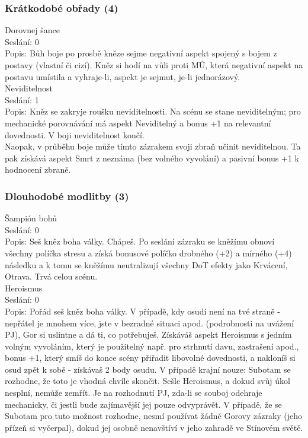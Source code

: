 \documentclass[../main.tex]{subfiles}
\begin{document}
\subsubsection{Krátkodobé obřady (4)}


Dorovnej šance\\
Seslání: 0 \\
Popis: Bůh boje po prosbě kněze sejme negativní aspekt spojený s bojem z postavy (vlastní či cizí).  Kněz si hodí na vůli proti MÚ, která negativní aspekt na postavu umístila a vyhraje-li, aspekt je sejmut, je-li jednorázový. \\


Neviditelnost\\
Seslání: 1\\
Popis: Kněz se zakryje roušku neviditelnosti. Na scénu se stane neviditelným; pro mechanické porovnávání má aspekt Neviditelný a bonus +1 na relevantní dovednosti. V boji neviditelnost končí. \\
Naopak, v průběhu boje může tímto zázrakem svoji zbraň učinit neviditelnou. Ta pak získává aspekt Smrt z neznáma (bez volného vyvolání) a pasivní bonus +1 k hodnocení zbraně.\\


\subsubsection{Dlouhodobé modlitby (3)}


Šampión bohů\\
Seslání: 0\\
Popis: Seš kněz boha války. Chápeš. Po seslání zázraku se kněžímu obnoví všechny políčka stresu a získá bonusové políčko drobného (+2) a mírného (+4) následku a k tomu se kněžímu neutralizují všechny DoT efekty jako Krvácení, Otrava. Trvá celou scénu.\\

Heroismus\\
Seslání: 0\\
Popis: Pořád seš kněz boha války. V případě, kdy osudí není na tvé straně - nepřátel je mnohem více, jste v bezradné situaci apod. (podrobnosti na uvážení PJ), Gor si uslintne a dá ti, co potřebuješ.  Získáváš aspekt Heroismus s jedním volným vyvoláním, který je použitelný např. pro strhnutí davu, zastrašení apod., bonus +1, který smíš do konce scény přiřadit libovolné dovednosti, a nakloníš si osud zpět k sobě - získávaš 2 body osudu. 
	V případě krajní nouze: Subotam se rozhodne, že toto je vhodná chvíle skončit. Sešle Heroismus, a dokud svůj úkol nesplní, nemůže zemřít. Je na rozhodnutí PJ, zda-li se souboj odehraje mechanicky, či jestli bude zajímavější jej pouze odvyprávět. V případě, že se Subotam pro tuto možnost rozhodne, nesmí používat žádné Gorovy zázraky (jeho přízeň si vyčerpal), dokud jej osobně nenavštíví v jeho zahradě ve Stínovém světě.\\
\end{document}
